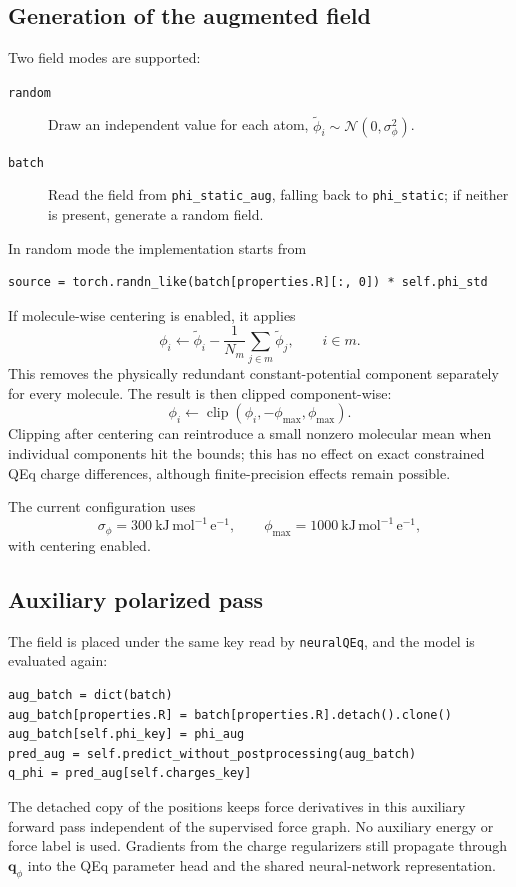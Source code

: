 \documentclass[11pt,a4paper]{article}
\newcommand{\vect}[1]{\bm{#1}}
\begin{document}
\subsection{Generation of the augmented field}

Two field modes are supported:
\begin{description}
  \item[\texttt{random}] Draw an independent value for each atom,
    $\widetilde\phi_i\sim\mathcal N(0,\sigma_\phi^2)$.
  \item[\texttt{batch}] Read the field from \texttt{phi\_static\_aug}, falling
    back to \texttt{phi\_static}; if neither is present, generate a random field.
\end{description}
In random mode the implementation starts from
\begin{lstlisting}[style=pythonstyle]
source = torch.randn_like(batch[properties.R][:, 0]) * self.phi_std
\end{lstlisting}
If molecule-wise centering is enabled, it applies
\begin{equation}
  \phi_i\leftarrow\widetilde\phi_i
  -\frac{1}{N_m}\sum_{j\in m}\widetilde\phi_j,
  \qquad i\in m.
  \label{eq:field-centering}
\end{equation}
This removes the physically redundant constant-potential component separately
for every molecule.  The result is then clipped component-wise:
\begin{equation}
  \phi_i\leftarrow\operatorname{clip}
  (\phi_i,-\phi_{\max},\phi_{\max}).
\end{equation}
Clipping after centering can reintroduce a small nonzero molecular mean when
individual components hit the bounds; this has no effect on exact constrained
QEq charge differences, although finite-precision effects remain possible.

The current configuration uses
\begin{equation}
  \sigma_\phi=300\ \mathrm{kJ\,mol^{-1}\,e^{-1}},
  \qquad
  \phi_{\max}=1000\ \mathrm{kJ\,mol^{-1}\,e^{-1}},
\end{equation}
with centering enabled.

\subsection{Auxiliary polarized pass}

The field is placed under the same key read by \texttt{neuralQEq}, and the
model is evaluated again:
\begin{lstlisting}[style=pythonstyle]
aug_batch = dict(batch)
aug_batch[properties.R] = batch[properties.R].detach().clone()
aug_batch[self.phi_key] = phi_aug
pred_aug = self.predict_without_postprocessing(aug_batch)
q_phi = pred_aug[self.charges_key]
\end{lstlisting}
The detached copy of the positions keeps force derivatives in this auxiliary
forward pass independent of the supervised force graph.  No auxiliary energy
or force label is used.  Gradients from the charge regularizers still propagate
through $\vect q_\phi$ into the QEq parameter head and the shared neural-network
representation.
\end{document}

